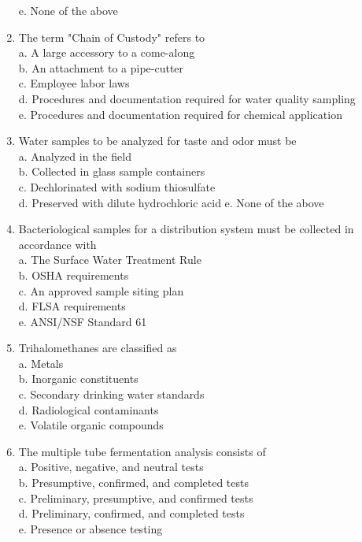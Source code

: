 \begin{enumerate}[1.]
e. None of the above\\
\item The term "Chain of Custody" refers to\\
a. A large accessory to a come-along\\
b. An attachment to a pipe-cutter\\
c. Employee labor laws\\
d. Procedures and documentation required for water quality sampling\\
e. Procedures and documentation required for chemical application\\
\item Water samples to be analyzed for taste and odor must be\\
a. Analyzed in the field\\
b. Collected in glass sample containers\\
c. Dechlorinated with sodium thiosulfate\\
d. Preserved with dilute hydrochloric acid e. None of the above\\
\item Bacteriological samples for a distribution system must be collected in accordance with\\
a. The Surface Water Treatment Rule\\
b. OSHA requirements\\
c. An approved sample siting plan\\
d. FLSA requirements\\
e. ANSI/NSF Standard 61\\
\item Trihalomethanes are classified as\\
a. Metals\\
b. Inorganic constituents\\
c. Secondary drinking water standards\\
d. Radiological contaminants\\
e. Volatile organic compounds\\
\item The multiple tube fermentation analysis consists of\\
a. Positive, negative, and neutral tests\\
b. Presumptive, confirmed, and completed tests\\
c. Preliminary, presumptive, and confirmed tests\\
d. Preliminary, confirmed, and completed tests\\
e. Presence or absence testing\\

\end{enumerate}
